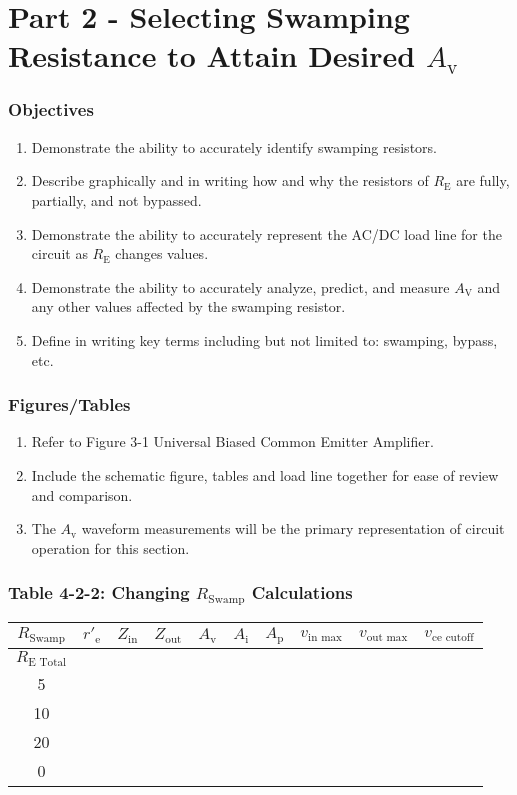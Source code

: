 
\section{Part 2 - Selecting Swamping Resistance to Attain Desired $A_{\text{v}}$}

\subsubsection{Objectives}
\begin{enumerate}
    \item Demonstrate the ability to accurately identify swamping resistors.
    \item Describe graphically and in writing how and why the resistors of $R_{\text{E}}$ are fully, partially, and not bypassed.
    \item Demonstrate the ability to accurately represent the AC/DC load line for the circuit as $R_{\text{E}}$ changes values.
    \item Demonstrate the ability to accurately analyze, predict, and measure $A_{\text{V}}$ and any other values affected by the swamping resistor.
    \item Define in writing key terms including but not limited to: swamping, bypass, etc.
\end{enumerate}

\subsubsection{Figures/Tables}
\begin{enumerate}
    \item Refer to Figure 3-1 Universal Biased Common Emitter Amplifier.
    \item Include the schematic figure, tables and load line together for ease of review and comparison.
    \item The $A_{\text{v}}$ waveform measurements will be the primary representation of circuit operation for this section.
\end{enumerate}

\subsubsection{Table 4-2-2: Changing $R_{\text{Swamp}}$ Calculations}
\begin{tabular}{|c|c|c|c|c|c|c|c|c|c|}
    \hline
    $R_{\text{Swamp}}$ & $r'_{\text{e}}$ & $Z_{\text{in}}$ & $Z_{\text{out}}$ & $A_{\text{v}}$ & $A_{\text{i}}$ & $A_{\text{p}}$ & $v_{\text{in max}}$ & $v_{\text{out max}}$ & $v_{\text{ce cutoff}}$ \\
    \hline
    $R_{\text{E Total}}$ & & & & & & & & & \\
    \hline
    5 & & & & & & & & & \\
    \hline
    10 & & & & & & & & & \\
    \hline
    20 & & & & & & & & & \\
    \hline
    0 & & & & & & & & & \\
    \hline
\end{tabular}
